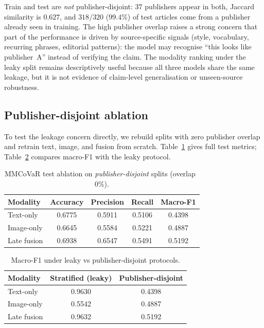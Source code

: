 \documentclass[12pt, a4paper]{report}
\begin{document}
Train and test are \emph{not} publisher-disjoint: $37$ publishers appear in both, Jaccard similarity is $0.627$, and $318/320$ ($99.4\%$) of test articles come from a publisher already seen in training.
The high publisher overlap raises a strong concern that part of the performance is driven by source-specific signals (style, vocabulary, recurring phrases, editorial patterns): the model may recognise ``this looks like publisher~A'' instead of verifying the claim.
The modality ranking under the leaky split remains descriptively useful because all three models share the same leakage, but it is not evidence of claim-level generalisation or unseen-source robustness.

\subsection{Publisher-disjoint ablation}
\label{sec:pubdisjoint}

To test the leakage concern directly, we rebuild splits with zero publisher overlap and retrain text, image, and fusion from scratch.
Table~\ref{tab:ablation-pubdisjoint} gives full test metrics; Table~\ref{tab:ablation-compare} compares macro-F1 with the leaky protocol.

\begin{table}[htbp]
\centering
\caption{MMCoVaR test ablation on \emph{publisher-disjoint} splits (overlap~$0\%$).}
\label{tab:ablation-pubdisjoint}
\begin{tabular}{lcccc}
\hline
Modality & Accuracy & Precision & Recall & Macro-F1 \\
\hline
Text-only   & 0.6775 & 0.5911 & 0.5106 & 0.4398 \\
Image-only  & 0.6645 & 0.5584 & 0.5221 & 0.4887 \\
Late fusion & 0.6938 & 0.6547 & 0.5491 & 0.5192 \\
\hline
\end{tabular}
\end{table}

\begin{table}[htbp]
\centering
\caption{Macro-F1 under leaky vs publisher-disjoint protocols.}
\label{tab:ablation-compare}
\begin{tabular}{lcc}
\hline
Modality & Stratified (leaky) & Publisher-disjoint \\
\hline
Text-only   & 0.9630 & 0.4398 \\
Image-only  & 0.5542 & 0.4887 \\
Late fusion & 0.9632 & 0.5192 \\
\hline
\end{tabular}
\end{table}
\end{document}
